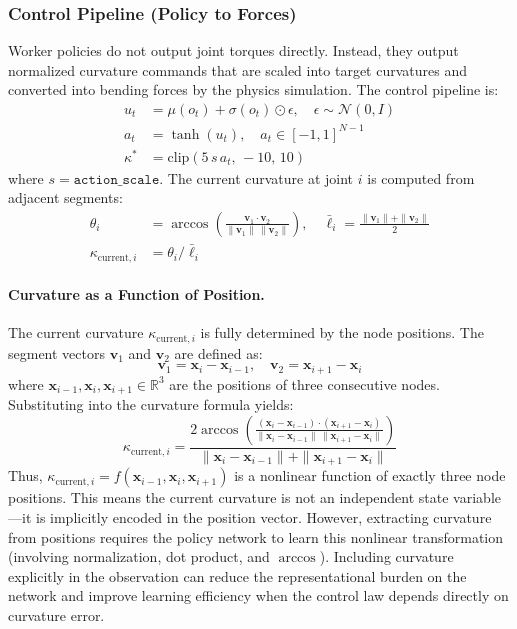 \documentclass[11pt]{article}
\begin{document}
\subsubsection{Control Pipeline (Policy to Forces)}

Worker policies do not output joint torques directly. Instead, they output normalized curvature commands that are scaled into target curvatures and converted into bending forces by the physics simulation. The control pipeline is:
\begin{align}
    u_t &= \mu(o_t) + \sigma(o_t) \odot \epsilon, \quad \epsilon \sim \mathcal{N}(0, I) \\
    a_t &= \tanh(u_t), \quad a_t \in [-1, 1]^{N-1} \\
    \kappa^{*} &= \mathrm{clip}(5\,s\,a_t,\,-10,\,10)
\end{align}
where $s = \texttt{action\_scale}$. The current curvature at joint $i$ is computed from adjacent segments:
\begin{align}
    \theta_i &= \arccos\left(\frac{\mathbf{v}_1 \cdot \mathbf{v}_2}{\|\mathbf{v}_1\|\,\|\mathbf{v}_2\|}\right), \quad
    \bar{\ell}_i = \frac{\|\mathbf{v}_1\| + \|\mathbf{v}_2\|}{2} \\
    \kappa_{\text{current}, i} &= \theta_i / \bar{\ell}_i
\end{align}

\paragraph{Curvature as a Function of Position.}
The current curvature $\kappa_{\text{current}, i}$ is fully determined by the node positions. The segment vectors $\mathbf{v}_1$ and $\mathbf{v}_2$ are defined as:
\begin{equation}
    \mathbf{v}_1 = \mathbf{x}_i - \mathbf{x}_{i-1}, \quad \mathbf{v}_2 = \mathbf{x}_{i+1} - \mathbf{x}_i
\end{equation}
where $\mathbf{x}_{i-1}, \mathbf{x}_i, \mathbf{x}_{i+1} \in \mathbb{R}^3$ are the positions of three consecutive nodes. Substituting into the curvature formula yields:
\begin{equation}
    \kappa_{\text{current}, i} = \frac{2 \arccos\left(\frac{(\mathbf{x}_i - \mathbf{x}_{i-1}) \cdot (\mathbf{x}_{i+1} - \mathbf{x}_i)}{\|\mathbf{x}_i - \mathbf{x}_{i-1}\|\,\|\mathbf{x}_{i+1} - \mathbf{x}_i\|}\right)}{\|\mathbf{x}_i - \mathbf{x}_{i-1}\| + \|\mathbf{x}_{i+1} - \mathbf{x}_i\|}
\end{equation}
Thus, $\kappa_{\text{current}, i} = f(\mathbf{x}_{i-1}, \mathbf{x}_i, \mathbf{x}_{i+1})$ is a nonlinear function of exactly three node positions. This means the current curvature is not an independent state variable---it is implicitly encoded in the position vector. However, extracting curvature from positions requires the policy network to learn this nonlinear transformation (involving normalization, dot product, and $\arccos$). Including curvature explicitly in the observation can reduce the representational burden on the network and improve learning efficiency when the control law depends directly on curvature error.
\end{document}
